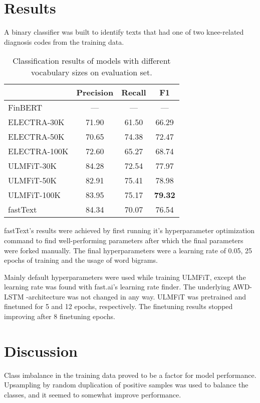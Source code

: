 \section{Results}\label{Results}
A binary classifier was built to identify texts that had one of two knee-related diagnosis codes from the training data.

\begin{table}[t]
\begin{center}
\begin{tabular}{lccc}
         & Precision & Recall & F1 \\
        \hline
FinBERT &      ---   &    --- &  ---   \\
ELECTRA-30K    &     71.90 & 61.50 & 66.29 \\
ELECTRA-50K  &      70.65 & 74.38 & 72.47 \\
ELECTRA-100K  &     72.60 & 65.27 & 68.74 \\
ULMFiT-30K  &    84.28 & 72.54 & 77.97 \\
ULMFiT-50K  &   82.91 & 75.41 & 78.98 \\
ULMFiT-100K  &  83.95 & 75.17 & \textbf{79.32} \\
fastText &  84.34 & 70.07 & 76.54 \\
\end{tabular}
\caption{Classification results of models with different vocabulary sizes on evaluation set.}
\label{table:results}
\end{center}
\end{table}

fastText's results were achieved by first running it's hyperparameter optimization command to find well-performing parameters after which the final parameters were forked manually.
The final hyperparameters were a learning rate of 0.05, 25 epochs of training and the usage of word bigrams.

Mainly default hyperparameters were used while training ULMFiT, except the learning rate was found with fast.ai's learning rate finder.
The underlying AWD-LSTM -architecture was not changed in any way.
ULMFiT was pretrained and finetuned for 5 and 12 epochs, respectively.
The finetuning results stopped improving after 8 finetuning epochs.


\section{Discussion}\label{Discussion}
Class imbalance in the training data proved to be a factor for model performance.
Upsampling by random duplication of positive samples was used to balance the classes, and it seemed to somewhat improve performance.

